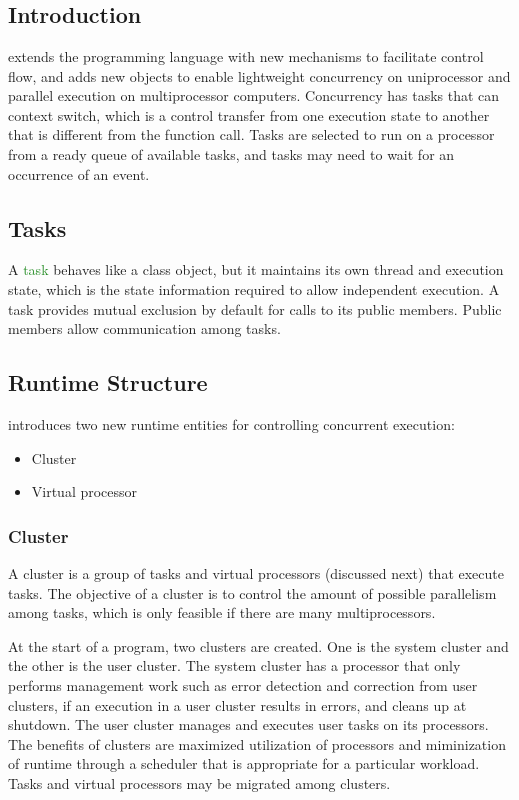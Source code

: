 \chapter{\uCPP} \label{uCPP}

\section{Introduction}
\uCPPS \cite{reference10} extends the \CCS programming language with new
mechanisms to
facilitate control flow, and adds new objects to enable lightweight concurrency
on uniprocessor and parallel execution on multiprocessor computers. Concurrency has tasks
that can context switch, which is a control transfer from one execution state to
another that is different from the function call. Tasks are selected to run on a
processor from a ready queue of available tasks, and tasks may need to wait for an occurrence of an event.

\section{Tasks}
A \textcolor{ForestGreen}{task} behaves like a class object, but it maintains its own
thread and execution state, which is the state information required to allow
independent execution. A task provides mutual exclusion by default for calls to its
public members. Public members allow communication among tasks.

\section{\uCPPS Runtime Structure}
\uCPPS introduces two new runtime entities for controlling concurrent execution:
\begin{itemize}
    \item Cluster
    \item Virtual processor
\end{itemize}

\subsection{Cluster}
A cluster is a group of tasks and virtual processors (discussed next) that
execute tasks. The objective of a cluster is to control the amount of possible
parallelism among tasks, which is only feasible if there are many
multiprocessors.

At the start of a \uCPPS program, two clusters are created. One is the system
cluster and the other is the user cluster. The system cluster has a
processor that only performs management work such as error detection and
correction from user clusters, if an execution in a user cluster results in errors,
and cleans up at shutdown. The user cluster manages and
executes user tasks on its processors. The benefits of clusters
are maximized utilization of processors and miminization of runtime through a scheduler that is appropriate for a particular workload. Tasks and virtual
processors may be migrated among clusters.

